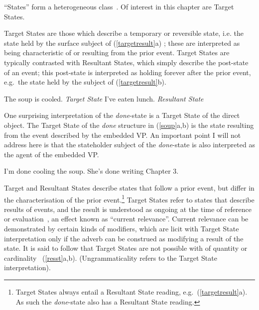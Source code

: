 \documentclass[output=paper,modfonts,nonflat]{langsci/langscibook}
\begin{document}
\enquote{States} form a heterogeneous class~\citep[see
especially][]{Kratzer2001a}. Of interest in this chapter are Target States.

Target States are those which describe a temporary or reversible state, i.e.
the state held by the surface subject of (\ref{targetresult}a)
\citep{Parsons1990a, Kratzer2001a}; these are interpreted as being
characteristic of or resulting from the prior event. Target States are
typically contrasted with Resultant States, which simply describe the
post-state of an event; this post-state is interpreted as holding forever after
the prior event, e.g.\  the state held by the subject of
(\ref{targetresult}b).

\begin{exe}
\ex\label{targetresult}
\begin{xlist}
\ex The soup is cooled. \hfill \emph{Target State}
\ex I've eaten lunch. \hfill \emph{Resultant State}
\end{xlist}
\end{exe}

One surprising interpretation of the \emph{done}-state is a Target State of the
direct object. The Target State of the \emph{done} structure in (\ref{soup}a,b)
is the state resulting from the event described by the embedded VP\@. An
important point I will not address here is that the stateholder subject of the
\emph{done}-state is also interpreted as the agent of the embedded VP\@.

\begin{exe}
\ex\label{soup}
\begin{xlist}
\ex I'm done cooling the soup.
\ex She's done writing Chapter 3.
\end{xlist}
\end{exe}

Target and Resultant States describe states that follow a prior event, but
differ in the characterisation of the prior event.\footnote{Target States
always entail a Resultant State reading, e.g.\   (\ref{targetresult}a).  As
such the \emph{done}-state also has a Resultant State reading.}  Target States
refer to states that describe results of events, and the result is understood
as ongoing at the time of reference or evaluation~\citep{Kratzer2001a}, an
effect known as \enquote{current relevance}. Current relevance can be
demonstrated by certain kinds of modifiers, which are licit with Target State
interpretation only if the adverb can be construed as modifying a result of the
state. It is said to follow that Target States are not possible with  of
quantity or cardinality~\citep{Mittwoch2008a} (\ref{resst}a,b).
(Ungrammaticality refers to the Target State interpretation).
\end{document}
